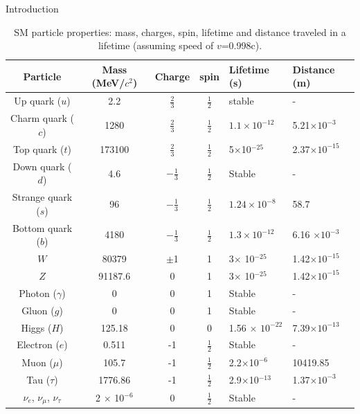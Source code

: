 \begin{chapter}{Introduction}
\begin{table}[htp]
\caption[Table of particles in SM]{SM particle properties: mass, charges, spin, lifetime and distance traveled in a lifetime (assuming speed of $v$=0.998c)\cite{pd}.}
\renewcommand{\arraystretch}{1.5}
\begin{tabular}{|c|c|c|c|p{2.5cm}|p{2.5cm}|}
\hline 
Particle& Mass (MeV/$c^2$) &Charge & spin &Lifetime (s) & Distance (m) \\ 
	\hline 
Up quark ($u$)	& 2.2 & $\frac{2}{3}$ & $\frac{1}{2}$ & stable & -\\ 
	\hline 
Charm quark ($c$)	& 1280 &$\frac{2}{3}$ & $\frac{1}{2}$ & $ 1.1 \times 10^{-12}$ & 5.21$\times 10^{-3}$ \\ 
	\hline 
Top	quark ($t$)& 173100 & $\frac{2}{3}$ & $\frac{1}{2}$ & 5$\times$10$^{-25}$ &2.37$\times 10^{-15}$  \\ 
	\hline 
Down quark ($d$)	& 4.6 &$-\frac{1}{3}$ & $\frac{1}{2}$ & Stable & - \\ 
	\hline 
Strange quark ($s$)	& 96 &$-\frac{1}{3}$ & $\frac{1}{2}$ &$1.24 \times 10^{-8}$ & 58.7 \\ 
	\hline 
Bottom quark ($b$)	& 4180 &$-\frac{1}{3}$ & $\frac{1}{2}$ &$1.3 \times 10^{-12}$  & 6.16 $\times 10^{-3}$\\ 
	\hline 
$W$ 	& 80379 &$\pm$1 & 1 & 3$\times$ 10$^{-25}$ & 1.42$\times 10^{-15}$\\ 
	\hline 
$Z$ & 91187.6 &0 & 1 & 3$\times$ 10$^{-25}$ &1.42$\times 10^{-15}$ \\ 
\hline
Photon ($\gamma$) & 0 &0 & 1&Stable & - \\ 
\hline
Gluon ($g$)	& 0 &0 & 1&Stable & - \\ 
	\hline 
Higgs ($H$)	& 125.18 &0 & 0& 1.56 $\times$ $10^{-22}$ & 7.39$\times 10^{-13}$ \\ 
	\hline 
Electron ($e$)& 0.511 & -1 &  $\frac{1}{2}$& Stable & - \\ 
	\hline 
Muon ($\mu$)	& 105.7 & -1 & $\frac{1}{2}$ & 2.2$\times$10$^{-6}$ & 10419.85 \\ 
	\hline 
Tau ($\tau$)	& 1776.86 &-1 & $\frac{1}{2}$ & 2.9$\times$10$^{-13}$ & 1.37$\times 10^{-3}$\\ 
	\hline 
$\nu_e$, $\nu_\mu$, $\nu_\tau$& 2 $\times$ 10$^{-6}$ & 0 & $\frac{1}{2}$ & Stable & -\\
	\hline 
\end{tabular} 
\label{SM table}
\end{table}

\newpage


\end{chapter}
